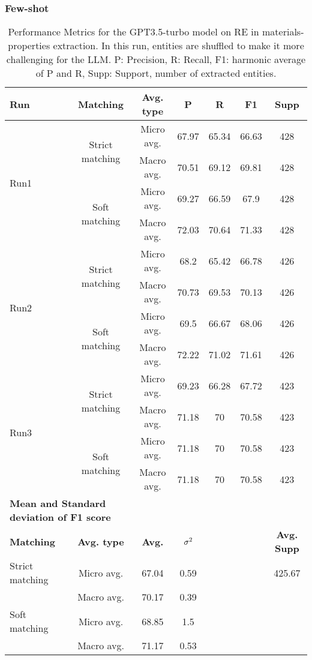 \clearpage
\subsubsection{Few-shot}


\begin{table}[htbp]
    \small
    \centering
    \caption{Performance Metrics for the GPT3.5-turbo model on RE in materials-properties extraction. In this run, entities are shuffled to make it more challenging for the LLM. P: Precision, R: Recall, F1: harmonic average of P and R, Supp: Support, number of extracted entities.}
    \begin{tabular}{lcccccc}
        \toprule
        \textbf{Run} & \textbf{Matching} & \textbf{Avg. type} & \textbf{P} & \textbf{R} & \textbf{F1} & \textbf{Supp} \\
        \midrule
        \multirow{4}{*}{Run1} & \multirow{2}{*}{Strict matching} & Micro avg. & 67.97 & 65.34 & 66.63 & 428 \\
        & & Macro avg. & 70.51 & 69.12 & 69.81 & 428 \\
        \cmidrule{2-7}
        & \multirow{2}{*}{Soft matching} & Micro avg. & 69.27 & 66.59 & 67.9 & 428 \\
        & & Macro avg. & 72.03 & 70.64 & 71.33 & 428 \\
        \midrule
        \multirow{4}{*}{Run2} & \multirow{2}{*}{Strict matching} & Micro avg. & 68.2 & 65.42 & 66.78 & 426 \\
        & & Macro avg. & 70.73 & 69.53 & 70.13 & 426 \\
        \cmidrule{2-7}
        & \multirow{2}{*}{Soft matching} & Micro avg. & 69.5 & 66.67 & 68.06 & 426 \\
        & & Macro avg. & 72.22 & 71.02 & 71.61 & 426 \\
        \midrule
        \multirow{4}{*}{Run3} & \multirow{2}{*}{Strict matching} & Micro avg. & 69.23 & 66.28 & 67.72 & 423 \\
        & & Macro avg. & 71.18 & 70 & 70.58 & 423 \\
        \cmidrule{2-7}
        & \multirow{2}{*}{Soft matching} & Micro avg. & 71.18 & 70 & 70.58 & 423 \\
        & & Macro avg. & 71.18 & 70 & 70.58 & 423 \\
        \midrule
        \multicolumn{2}{l}{\textbf{Mean and Standard deviation of F1 score}} & & & & & \\
        \midrule
        \textbf{Matching} & \textbf{Avg. type} & \textbf{Avg.} & $\sigma\textsuperscript{2}$ & & & \textbf{Avg. Supp}\\
        Strict matching & Micro avg. & 67.04 & 0.59 & & & 425.67 \\
        & Macro avg. & 70.17 & 0.39 & & & \\
        Soft matching & Micro avg. & 68.85 & 1.5 & & & \\
        & Macro avg. & 71.17 & 0.53 & & & \\
        \bottomrule
    \end{tabular}
\end{table}

